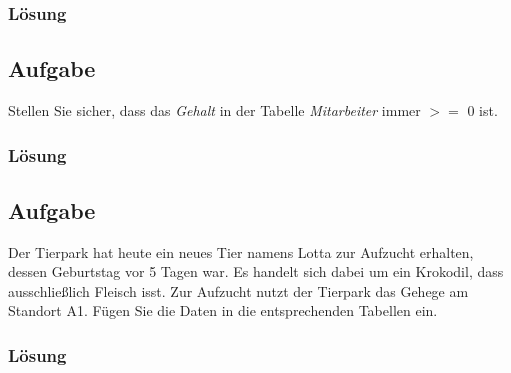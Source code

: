 \subsubsection*{Lösung}
\label{subsubsec:uebung_01.aufgabe_03.loesung}


\subsection{Aufgabe}
\label{subsec:uebung_01.aufgabe_04}
Stellen Sie sicher, dass das \textit{Gehalt} in der Tabelle \textit{Mitarbeiter} immer $>=$ 0 ist.

\subsubsection*{Lösung}
\label{subsubsec:uebung_01.aufgabe_04.loesung}


\subsection{Aufgabe}
\label{subsec:uebung_01.aufgabe_05}
Der Tierpark hat heute ein neues Tier namens Lotta zur Aufzucht erhalten, dessen Geburtstag vor 5 Tagen war. Es handelt sich dabei um ein Krokodil, dass ausschließlich Fleisch isst. Zur Aufzucht nutzt der Tierpark das Gehege am Standort A1. Fügen Sie die Daten in die entsprechenden Tabellen ein.

\subsubsection*{Lösung}
\label{subsubsec:uebung_01.aufgabe_5.loesung}


